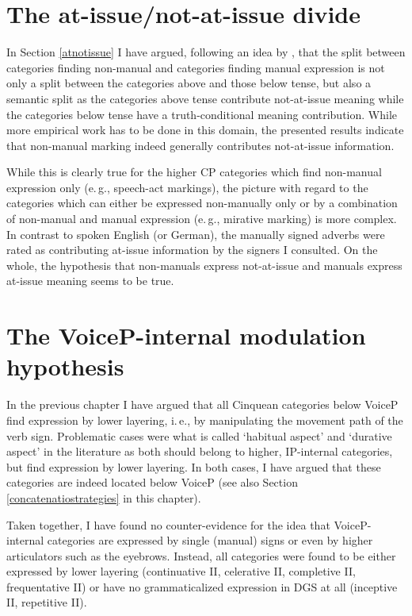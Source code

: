\section{The at-issue/not-at-issue divide}
In Section \ref{atnotissue} I have argued, following an idea by \citet{bross2017scope}, that the split between categories finding non-manual and categories finding manual expression is not only a split between the categories above and those below tense, but also a semantic split as the categories above tense contribute not-at-issue meaning while the categories below tense have a truth-conditional meaning contribution. While more empirical work has to be done in this domain, the presented results indicate that non-manual marking indeed generally contributes not-at-issue information. 

While this is clearly true for the higher CP categories which find non-manual expression only (e.\,g., speech-act markings), the picture with regard to the categories which can either be expressed non-manually only or by a combination of non-manual and manual expression (e.\,g., mirative marking) is more complex. In contrast to spoken English (or German), the manually signed adverbs were rated as contributing at-issue information by the signers I consulted. On the whole, the hypothesis that non-manuals express not-at-issue and manuals express at-issue meaning seems to be true. %





\section{The VoiceP-internal modulation hypothesis}
In the previous chapter I have argued that all Cinquean categories below VoiceP find expression by lower layering, i.\,e., by manipulating the movement path of the verb sign. Problematic cases were what is called `habitual aspect' and `durative aspect' in the literature as both should belong to higher, IP-internal categories, but find expression by lower layering. In both cases, I have argued that these categories are indeed located below VoiceP (see also Section \ref{concatenatiostrategies} in this chapter). 


Taken together, I have found no counter-evidence for the idea that VoiceP-internal categories are expressed by single (manual) signs or even by higher articulators such as the eyebrows. Instead, all categories were found to be either expressed by lower layering (continuative II, celerative II, completive II, frequentative II) or have no grammaticalized expression in DGS at all (inceptive II, repetitive II). 


